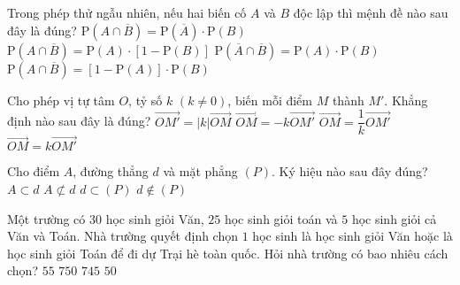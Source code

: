 \begin{ex}%
	Trong phép thử ngẫu nhiên, nếu hai biến cố $A$ và $B$ độc lập thì mệnh đề nào sau đây là đúng?
	\choice
	{$\mathrm{P}\left(A\cap \overline{B}\right)=\mathrm{P}\left(\overline{A}\right)\cdot \mathrm{P}\left(B\right)$}
	{\True $\mathrm{P}\left(A\cap \overline{B}\right)=\mathrm{P}\left(A\right) \cdot \left[1-\mathrm{P}\left(B\right)\right]$}
	{$\mathrm{P}\left(\overline{A}\cap \overline{B}\right)=\mathrm{P}\left(A\right) \cdot \mathrm{P}\left(B\right)$}
	{$\mathrm{P}\left(A\cap \overline{B}\right)=\left[1-\mathrm{P}\left(A\right)\right] \cdot \mathrm{P}\left(B\right)$}
\end{ex}

\begin{ex}%
	Cho phép vị tự tâm $O$, tỷ số $k$ $\left(k \neq 0\right)$, biến mỗi điểm $M$ thành $M'$. Khẳng định nào sau đây là đúng?
	\choice
	{$\vec{OM'}=|k|\vec{OM}$}
	{$\vec{OM}=-k\vec{OM'}$}
	{\True $\vec{OM}=\dfrac{1}{k}\vec{OM'}$}
	{$\vec{OM}=k\vec{OM'}$}
\end{ex}

\begin{ex}%
	Cho điểm $A$, đường thẳng $d$ và mặt phẳng $(P)$. Ký hiệu nào sau đây đúng?
	\choice
	{$A\subset d$}
	{$A\not\subset d$}
	{\True $d\subset (P)$}
	{$d\notin (P)$}
\end{ex}

\begin{ex}%
	Một trường có $30$ học sinh giỏi Văn, $25$ học sinh giỏi toán và $5$ học sinh giỏi cả Văn và Toán. Nhà trường quyết định chọn $1$ học sinh là học sinh giỏi Văn hoặc là học sinh giỏi Toán để đi dự Trại hè toàn quốc. Hỏi nhà trường có bao nhiêu cách chọn?
	\choice
	{$55$}
	{$750$}
	{$745$}
	{\True $50$}
\end{ex}

